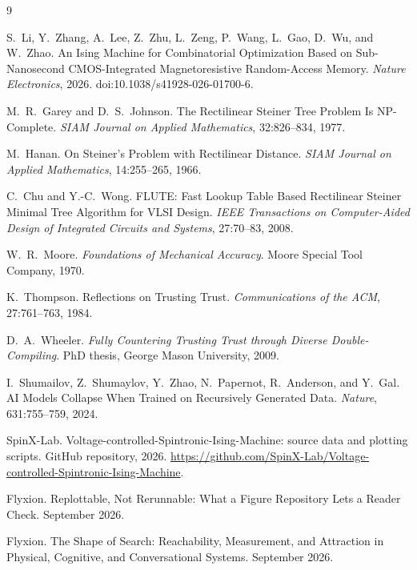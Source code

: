 \documentclass[11pt]{article}
\theoremstyle{definition}
\theoremstyle{remark}
\begin{document}
\begin{thebibliography}{9}

S.~Li, Y.~Zhang, A.~Lee, Z.~Zhu, L.~Zeng, P.~Wang, L.~Gao, D.~Wu, and W.~Zhao.
An Ising Machine for Combinatorial Optimization Based on Sub-Nanosecond CMOS-Integrated Magnetoresistive Random-Access Memory.
\emph{Nature Electronics}, 2026. doi:10.1038/s41928-026-01700-6.

M.~R.~Garey and D.~S.~Johnson.
The Rectilinear Steiner Tree Problem Is NP-Complete.
\emph{SIAM Journal on Applied Mathematics}, 32:826--834, 1977.

M.~Hanan.
On Steiner's Problem with Rectilinear Distance.
\emph{SIAM Journal on Applied Mathematics}, 14:255--265, 1966.

C.~Chu and Y.-C.~Wong.
FLUTE: Fast Lookup Table Based Rectilinear Steiner Minimal Tree Algorithm for VLSI Design.
\emph{IEEE Transactions on Computer-Aided Design of Integrated Circuits and Systems}, 27:70--83, 2008.

W.~R.~Moore.
\emph{Foundations of Mechanical Accuracy}.
Moore Special Tool Company, 1970.

K.~Thompson.
Reflections on Trusting Trust.
\emph{Communications of the ACM}, 27:761--763, 1984.

D.~A.~Wheeler.
\emph{Fully Countering Trusting Trust through Diverse Double-Compiling}.
PhD thesis, George Mason University, 2009.

I.~Shumailov, Z.~Shumaylov, Y.~Zhao, N.~Papernot, R.~Anderson, and Y.~Gal.
AI Models Collapse When Trained on Recursively Generated Data.
\emph{Nature}, 631:755--759, 2024.

SpinX-Lab.
Voltage-controlled-Spintronic-Ising-Machine: source data and plotting scripts.
GitHub repository, 2026. \url{https://github.com/SpinX-Lab/Voltage-controlled-Spintronic-Ising-Machine}.

Flyxion.
Replottable, Not Rerunnable: What a Figure Repository Lets a Reader Check.
September 2026.

Flyxion.
The Shape of Search: Reachability, Measurement, and Attraction in Physical, Cognitive, and Conversational Systems.
September 2026.

\end{thebibliography}
\end{document}
